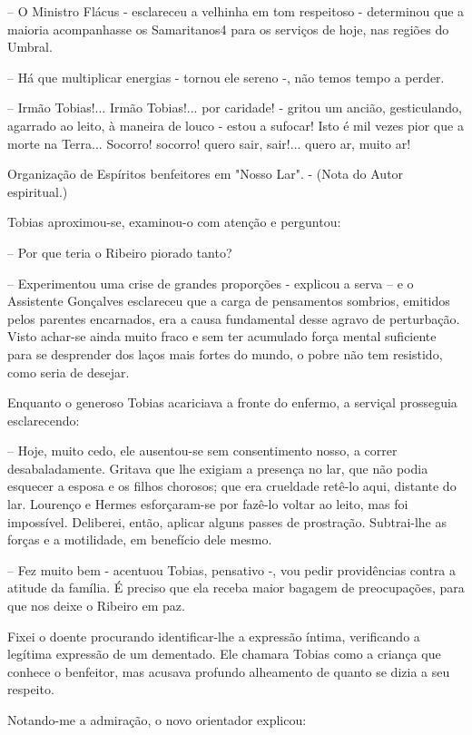 \documentclass[portuguese,12pt,a4paper]{scrbook}
\begin{document}
	– O Ministro Flácus - esclareceu a velhinha em tom respeitoso - determinou que a maioria acompanhasse os Samaritanos4 para os serviços de hoje, nas regiões do Umbral.
	
	– Há que multiplicar energias - tornou ele sereno -, não temos tempo a perder.
	
	– Irmão Tobias!... Irmão Tobias!... por caridade! - gritou um ancião, gesticulando, agarrado ao leito, à maneira de louco - estou a sufocar! Isto é mil vezes pior que a morte na Terra... Socorro! socorro! quero sair, sair!... quero ar, muito ar!
	
	Organização de Espíritos benfeitores em "Nosso Lar". - (Nota do Autor espiritual.)
	
	
	Tobias aproximou-se, examinou-o com atenção e perguntou:
	
	– Por que teria o Ribeiro piorado tanto?
	
	– Experimentou uma crise de grandes proporções - explicou a serva – e o Assistente Gonçalves esclareceu que a carga de pensamentos sombrios, emitidos pelos parentes encarnados, era a causa fundamental desse agravo de perturbação. Visto achar-se ainda muito fraco e sem ter acumulado força mental suficiente para se desprender dos laços mais fortes do mundo, o pobre não tem resistido, como seria de desejar.
	
	Enquanto o generoso Tobias acariciava a fronte do enfermo, a serviçal prosseguia esclarecendo:
	
	– Hoje, muito cedo, ele ausentou-se sem consentimento nosso, a correr desabaladamente. Gritava que lhe exigiam a presença no lar, que não podia esquecer a esposa e os filhos chorosos; que era crueldade retê-lo aqui, distante do lar. Lourenço e Hermes esforçaram-se por fazê-lo voltar ao leito, mas foi impossível. Deliberei, então, aplicar alguns passes de prostração. Subtrai-lhe as forças e a motilidade, em benefício dele mesmo.
	
	– Fez muito bem - acentuou Tobias, pensativo -, vou pedir providências contra a atitude da família. É preciso que ela receba maior bagagem de preocupações, para que nos deixe o Ribeiro em paz.
	
	Fixei o doente procurando identificar-lhe a expressão íntima, verificando a legítima expressão de um dementado. Ele chamara Tobias como a criança que conhece o benfeitor, mas acusava profundo alheamento de quanto se dizia a seu respeito.
	
	Notando-me a admiração, o novo orientador explicou:
	
\end{document}
